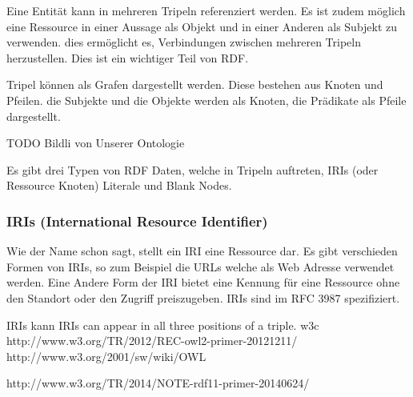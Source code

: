Eine Entität kann in mehreren Tripeln referenziert werden. Es ist zudem möglich eine Ressource in einer Aussage als Objekt und in einer Anderen als Subjekt zu verwenden. dies ermöglicht es, Verbindungen zwischen mehreren Tripeln herzustellen. Dies ist ein wichtiger Teil von RDF.

Tripel können als Grafen dargestellt werden. Diese bestehen aus Knoten und Pfeilen. die Subjekte und die Objekte werden als Knoten, die Prädikate als Pfeile dargestellt.



TODO Bildli von Unserer Ontologie

Es gibt drei Typen von RDF Daten, welche in Tripeln auftreten, IRIs (oder Ressource Knoten) Literale und Blank Nodes.

\subsubsection{IRIs (International Resource Identifier)}
\label{sec:owlRdf_rdf_dataModel_iris}
Wie der Name schon sagt, stellt ein IRI eine Ressource dar. Es gibt verschieden Formen von IRIs, so zum Beispiel die URLs welche als Web Adresse verwendet werden. Eine Andere Form der IRI bietet eine Kennung für eine Ressource ohne den Standort oder den Zugriff preiszugeben. IRIs sind im RFC 3987 spezifiziert.

IRIs kann IRIs can appear in all three positions of a triple.
w3c
http://www.w3.org/TR/2012/REC-owl2-primer-20121211/
http://www.w3.org/2001/sw/wiki/OWL

http://www.w3.org/TR/2014/NOTE-rdf11-primer-20140624/

